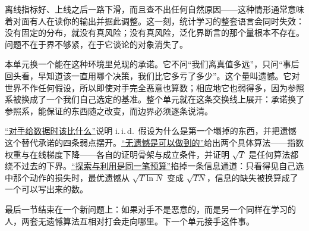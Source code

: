 离线指标好、上线之后一路下滑，而且查不出任何自然原因——这种情形通常意味着对面有人在读你的输出并据此调整。这一刻，统计学习的整套语言会同时失效：没有固定的分布，就没有真风险；没有真风险，泛化界断言的那个量根本不存在。问题不在于界不够紧，在于它谈论的对象消失了。

本单元换一个能在这种环境里兑现的承诺。它不问``我们离真值多远''，只问``事后回头看，早知道该一直用哪个决策，我们比它多亏了多少''。这个量叫遗憾。它对世界不作任何假设，所以即使对手完全恶意也算数；相应地它也弱得多，因为参照系被换成了一个我们自己选定的基准。整个单元就在这条交换线上展开：承诺换了参照系，能保证的东西随之改变，而边界必须逐条说清。

\hyperref[sec:17-Constrained-Guarantees/04-Online-Learning-and-Regret/01]{``对手给数据时该比什么''}说明 i.\,i.\,d.\ 假设为什么是第一个塌掉的东西，并把遗憾这个替代承诺的四条弱点摆开。\hyperref[sec:17-Constrained-Guarantees/04-Online-Learning-and-Regret/02]{``无遗憾是可以做到的''}给出两个具体算法——指数权重与在线梯度下降——各自的证明骨架与成立条件，并证明 \(\sqrt T\) 是任何算法都绕不过去的下界。\hyperref[sec:17-Constrained-Guarantees/04-Online-Learning-and-Regret/03]{``探索与利用是同一笔预算''}掐掉一条信息通道：只看得见自己选中那个动作的损失时，最优遗憾从 \(\sqrt{T\ln N}\) 变成 \(\sqrt{TN}\)，信息的缺失被换算成了一个可以写出来的数。

最后一节结束在一个新问题上：如果对手不是恶意的，而是另一个同样在学习的人，两套无遗憾算法互相对打会走向哪里。下一个单元接手这件事。
